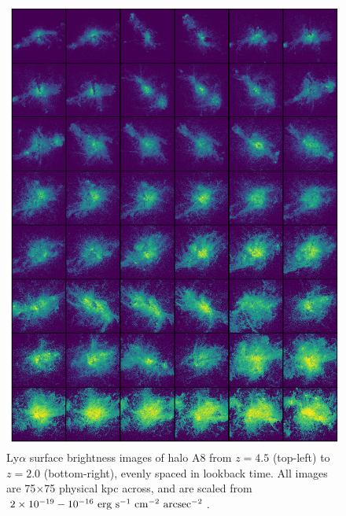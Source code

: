 \begin{figure}
    \centering
    \includegraphics[width=\textwidth,keepaspectratio]{figures/rogues_A8.png}
    \caption{
        Ly$\alpha$ surface brightness images of halo A8 from $z=4.5$ (top-left) to $z=2.0$ (bottom-right), evenly spaced in lookback time. 
        All images are 75$\times$75 physical kpc across, and are scaled from $2\times10^{-19}-10^{-16}\ \rm{erg}\ \rm{s}^{-1}\ \rm{cm}^{-2}\ \rm{arcsec}^{-2}$.
    }
  \label{fig:rogues8}
\end{figure}


